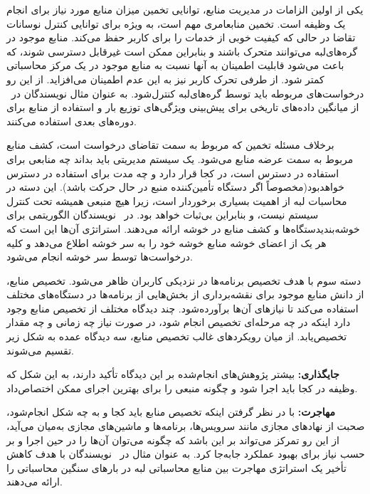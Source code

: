 
یکی از اولین الزامات در مدیریت منابع، توانایی تخمین میزان منابع مورد نیاز برای انجام یک وظیفه است. تخمین منابعامری مهم است، به ویژه برای توانایی کنترل نوسانات تقاضا در حالی که کیفیت خوبی از خدمات را برای کاربر حفظ می‌کند. منابع موجود در گره‌های‌لبه می‌توانند متحرک باشند و بنابراین ممکن است غیرقابل دسترسی شوند، که باعث می‌شود قابلیت اطمینان به آنها نسبت به منابع موجود در یک مرکز محاسباتی کمتر شود. از طرفی تحرک کاربر نیز به این عدم اطمینان می‌افزاید. از این رو درخواست‌های مربوطه باید توسط گره‌های‌لبه کنترل‌شود. به عنوان مثال نویسندگان در~\cite{aazam2016pre} از میانگین داده‌های تاریخی برای پیش‌بینی ویژگی‌های توزیع بار و استفاده از منابع برای دوره‌های بعدی استفاده می‌کنند.


برخلاف مسئله تخمین که مربوط به سمت تقاضای درخواست است، کشف منابع مربوط به سمت عرضه منابع می‌شود. یک سیستم مدیریتی باید بداند چه منابعی برای استفاده در دسترس است، در کجا قرار دارد و چه مدت برای استفاده در دسترس خواهدبود(مخصوصاً اگر دستگاه تأمین‌کننده منبع در حال حرکت باشد). این دسته در محاسبات لبه از اهمیت بسیاری برخوردار است، زیرا هیچ منبعی همیشه تحت کنترل سیستم نیست، و بنابراین بی‌ثبات خواهد بود. در~\cite{athwani2015resource} نویسندگان الگوریتمی برای خوشه‌بندیدستگاه‌ها و کشف منابع در خوشه ارائه می‌دهند. استراتژی آن‌ها این است که هر یک از اعضای خوشه منابع خوشه خود را به سر خوشه اطلاع می‌دهد و کلیه درخواست‌ها توسط سر خوشه انجام می‌شود.



دسته سوم با هدف تخصیص برنامه‌ها در نزدیکی کاربران ظاهر می‌شود. تخصیص منابع، از دانش منابع موجود برای نقشه‌برداری از بخش‌هایی از برنامه‌ها در دستگاه‌های مختلف استفاده می‌کند تا نیازهای آن‌ها برآورده‌شود. چند دیدگاه مختلف از تخصیص منابع وجود دارد اینکه در چه مرحله‌ای تخصیص انجام شود، در صورت نیاز چه زمانی و چه مقدار تخصیص‌یابد. از میان رویکردهای غالب تخصیص منابع، سه دیدگاه عمده به شکل زیر تقسیم می‌شوند.

 \textbf{جایگذاری:} بیشتر پژوهش‌های انجام‌شده بر این دیدگاه تأکید دارند، به این شکل که وظیفه در کجا باید اجرا شود و چگونه منبعی را برای بهترین اجرای ممکن اختصاص‌داد. 

 \textbf{مهاجرت:} با در نظر گرفتن اینکه تخصیص منابع باید کجا و به چه شکل انجام‌شود، صحبت از نهادهای مجازی مانند سرویس‌ها، برنامه‌ها و ماشین‌های مجازی به‌میان می‌آید، از این رو تمرکز می‌تواند بر این باشد که چگونه می‌توان آن‌ها را در حین اجرا و بر حسب نیاز برای بهبود عملکرد جابه‌جا کرد. به عنوان مثال در~\cite{chen2018task} نویسندگان با هدف کاهش تأخیر یک استراتژی مهاجرت بین منابع محاسباتی لبه در بارهای سنگین محاسباتی را ارائه می‌دهند.






